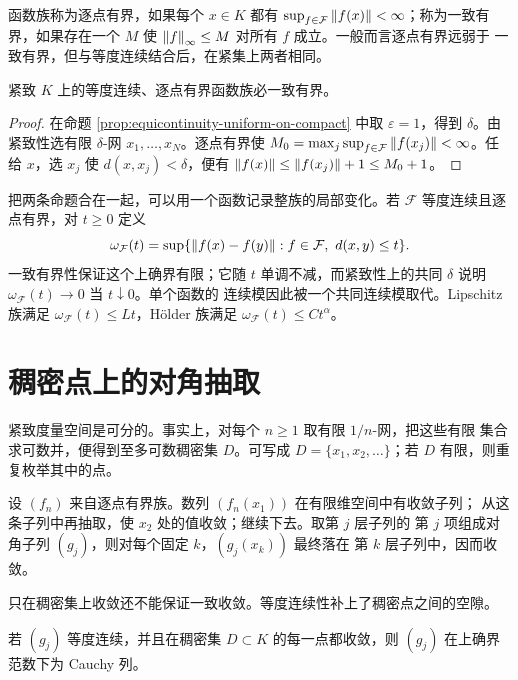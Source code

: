 函数族称为逐点有界，如果每个 $x\in K$ 都有
$\sup_{f\in\mathcal F}\left\lVert f(x)\right\rVert<\infty$；称为一致有界，如果存在一个
$M$ 使 $\left\lVert f\right\rVert_\infty\le M$ 对所有 $f$ 成立。一般而言逐点有界远弱于
一致有界，但与等度连续结合后，在紧集上两者相同。

\begin{proposition}
\label{prop:equicont-pointwise-to-uniform-bounded}
紧致 $K$ 上的等度连续、逐点有界函数族必一致有界。
\end{proposition}

\begin{proof}
在命题 \ref{prop:equicontinuity-uniform-on-compact} 中取
$\varepsilon=1$，得到 $\delta$。由紧致性选有限 $\delta$-网
$x_1,\ldots,x_N$。逐点有界使
$M_0=\max_j\sup_{f\in\mathcal F}\left\lVert f(x_j)\right\rVert<\infty$。任给 $x$，选
$x_j$ 使 $d(x,x_j)<\delta$，便有
$\left\lVert f(x)\right\rVert\le\left\lVert f(x_j)\right\rVert+1\le M_0+1$。
\end{proof}

把两条命题合在一起，可以用一个函数记录整族的局部变化。若
$\mathcal F$ 等度连续且逐点有界，对 $t\ge0$ 定义
\[
 \omega_{\mathcal F}(t)
 =\sup\{\left\lVert f(x)-f(y)\right\rVert:f\in\mathcal F,\ d(x,y)\le t\}.
\]
一致有界性保证这个上确界有限；它随 $t$ 单调不减，而紧致性上的共同
$\delta$ 说明 $\omega_{\mathcal F}(t)\to0$ 当 $t\downarrow0$。单个函数的
连续模因此被一个共同连续模取代。Lipschitz 族满足
$\omega_{\mathcal F}(t)\le Lt$，Hölder 族满足
$\omega_{\mathcal F}(t)\le Ct^\alpha$。

\section{稠密点上的对角抽取}

紧致度量空间是可分的。事实上，对每个 $n\ge1$ 取有限 $1/n$-网，把这些有限
集合求可数并，便得到至多可数稠密集 $D$。可写成
$D=\{x_1,x_2,\ldots\}$；若 $D$ 有限，则重复枚举其中的点。

设 $(f_n)$ 来自逐点有界族。数列 $(f_n(x_1))$ 在有限维空间中有收敛子列；
从这条子列中再抽取，使 $x_2$ 处的值收敛；继续下去。取第 $j$ 层子列的
第 $j$ 项组成对角子列 $(g_j)$，则对每个固定 $k$，$(g_j(x_k))$ 最终落在
第 $k$ 层子列中，因而收敛。

只在稠密集上收敛还不能保证一致收敛。等度连续性补上了稠密点之间的空隙。

\begin{lemma}
\label{lem:dense-convergence-equicont-uniform-cauchy}
若 $(g_j)$ 等度连续，并且在稠密集 $D\subset K$ 的每一点都收敛，则
$(g_j)$ 在上确界范数下为 Cauchy 列。
\end{lemma}

